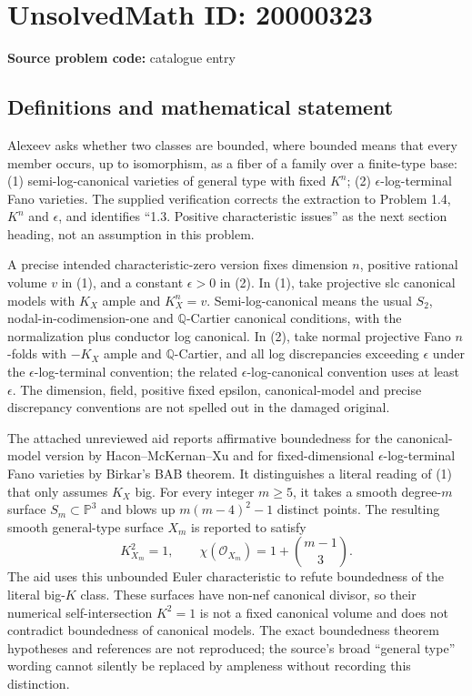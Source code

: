 \documentclass[11pt]{article}
\newcommand{\Q}{\mathbb{Q}}
\newcommand{\PP}{\mathbb{P}}
\begin{document}
\section*{UnsolvedMath ID: 20000323}
\textbf{Source problem code:} catalogue entry
\subsection{Definitions and mathematical statement}
Alexeev asks whether two classes are bounded, where bounded means that every member occurs, up to isomorphism, as a fiber of a family over a finite-type base: (1) semi-log-canonical varieties of general type with fixed $K^n$; (2) $\epsilon$-log-terminal Fano varieties. The supplied verification corrects the extraction to Problem 1.4, $K^n$ and $\epsilon$, and identifies ``1.3. Positive characteristic issues'' as the next section heading, not an assumption in this problem.

A precise intended characteristic-zero version fixes dimension $n$, positive rational volume $v$ in (1), and a constant $\epsilon>0$ in (2). In (1), take projective slc canonical models with $K_X$ ample and $K_X^n=v$. Semi-log-canonical means the usual $S_2$, nodal-in-codimension-one and $\Q$-Cartier canonical conditions, with the normalization plus conductor log canonical. In (2), take normal projective Fano $n$-folds with $-K_X$ ample and $\Q$-Cartier, and all log discrepancies exceeding $\epsilon$ under the $\epsilon$-log-terminal convention; the related $\epsilon$-log-canonical convention uses at least $\epsilon$. The dimension, field, positive fixed epsilon, canonical-model and precise discrepancy conventions are not spelled out in the damaged original.

The attached unreviewed aid reports affirmative boundedness for the canonical-model version by Hacon--McKernan--Xu and for fixed-dimensional $\epsilon$-log-terminal Fano varieties by Birkar's BAB theorem. It distinguishes a literal reading of (1) that only assumes $K_X$ big. For every integer $m\ge5$, it takes a smooth degree-$m$ surface $S_m\subset\PP^3$ and blows up $m(m-4)^2-1$ distinct points. The resulting smooth general-type surface $X_m$ is reported to satisfy
\[
K_{X_m}^2=1,\qquad
\chi(\mathcal O_{X_m})=1+\binom{m-1}{3}.
\]
The aid uses this unbounded Euler characteristic to refute boundedness of the literal big-$K$ class. These surfaces have non-nef canonical divisor, so their numerical self-intersection $K^2=1$ is not a fixed canonical volume and does not contradict boundedness of canonical models. The exact boundedness theorem hypotheses and references are not reproduced; the source's broad ``general type'' wording cannot silently be replaced by ampleness without recording this distinction.
\end{document}
